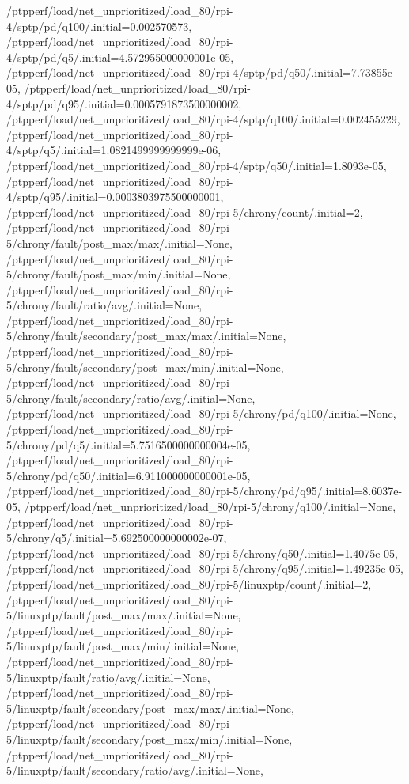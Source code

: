 {    /ptpperf/load/net_unprioritized/load_80/rpi-4/sptp/pd/q100/.initial=0.002570573,
    /ptpperf/load/net_unprioritized/load_80/rpi-4/sptp/pd/q5/.initial=4.572955000000001e-05,
    /ptpperf/load/net_unprioritized/load_80/rpi-4/sptp/pd/q50/.initial=7.73855e-05,
    /ptpperf/load/net_unprioritized/load_80/rpi-4/sptp/pd/q95/.initial=0.0005791873500000002,
    /ptpperf/load/net_unprioritized/load_80/rpi-4/sptp/q100/.initial=0.002455229,
    /ptpperf/load/net_unprioritized/load_80/rpi-4/sptp/q5/.initial=1.0821499999999999e-06,
    /ptpperf/load/net_unprioritized/load_80/rpi-4/sptp/q50/.initial=1.8093e-05,
    /ptpperf/load/net_unprioritized/load_80/rpi-4/sptp/q95/.initial=0.0003803975500000001,
    /ptpperf/load/net_unprioritized/load_80/rpi-5/chrony/count/.initial=2,
    /ptpperf/load/net_unprioritized/load_80/rpi-5/chrony/fault/post_max/max/.initial=None,
    /ptpperf/load/net_unprioritized/load_80/rpi-5/chrony/fault/post_max/min/.initial=None,
    /ptpperf/load/net_unprioritized/load_80/rpi-5/chrony/fault/ratio/avg/.initial=None,
    /ptpperf/load/net_unprioritized/load_80/rpi-5/chrony/fault/secondary/post_max/max/.initial=None,
    /ptpperf/load/net_unprioritized/load_80/rpi-5/chrony/fault/secondary/post_max/min/.initial=None,
    /ptpperf/load/net_unprioritized/load_80/rpi-5/chrony/fault/secondary/ratio/avg/.initial=None,
    /ptpperf/load/net_unprioritized/load_80/rpi-5/chrony/pd/q100/.initial=None,
    /ptpperf/load/net_unprioritized/load_80/rpi-5/chrony/pd/q5/.initial=5.7516500000000004e-05,
    /ptpperf/load/net_unprioritized/load_80/rpi-5/chrony/pd/q50/.initial=6.911000000000001e-05,
    /ptpperf/load/net_unprioritized/load_80/rpi-5/chrony/pd/q95/.initial=8.6037e-05,
    /ptpperf/load/net_unprioritized/load_80/rpi-5/chrony/q100/.initial=None,
    /ptpperf/load/net_unprioritized/load_80/rpi-5/chrony/q5/.initial=5.692500000000002e-07,
    /ptpperf/load/net_unprioritized/load_80/rpi-5/chrony/q50/.initial=1.4075e-05,
    /ptpperf/load/net_unprioritized/load_80/rpi-5/chrony/q95/.initial=1.49235e-05,
    /ptpperf/load/net_unprioritized/load_80/rpi-5/linuxptp/count/.initial=2,
    /ptpperf/load/net_unprioritized/load_80/rpi-5/linuxptp/fault/post_max/max/.initial=None,
    /ptpperf/load/net_unprioritized/load_80/rpi-5/linuxptp/fault/post_max/min/.initial=None,
    /ptpperf/load/net_unprioritized/load_80/rpi-5/linuxptp/fault/ratio/avg/.initial=None,
    /ptpperf/load/net_unprioritized/load_80/rpi-5/linuxptp/fault/secondary/post_max/max/.initial=None,
    /ptpperf/load/net_unprioritized/load_80/rpi-5/linuxptp/fault/secondary/post_max/min/.initial=None,
    /ptpperf/load/net_unprioritized/load_80/rpi-5/linuxptp/fault/secondary/ratio/avg/.initial=None,
}
